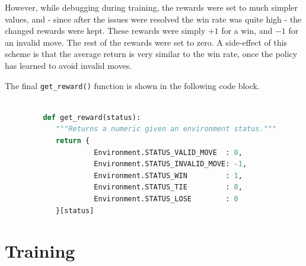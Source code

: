 \documentclass{article}
\begin{document}
   However, while debugging during training, the rewards were set to much simpler values, and - since
   after the issues were resolved the win rate was quite high - the changed rewards were kept. These rewards
   were simply $+1$ for a win, and $-1$ for an invalid move. The rest of the rewards were set to zero.
   A side-effect of this scheme is that the average return is very similar to the win rate, once the policy
   has learned to avoid invalid moves.

   The final \texttt{get\_reward()} function is shown in the following code block.
      \begin{lstlisting}[language=Python, label={reward}]

         def get_reward(status):
            """Returns a numeric given an environment status."""
            return {
                     Environment.STATUS_VALID_MOVE  : 0,
                     Environment.STATUS_INVALID_MOVE: -1,
                     Environment.STATUS_WIN         : 1,
                     Environment.STATUS_TIE         : 0,
                     Environment.STATUS_LOSE        : 0
            }[status]
      \end{lstlisting}


   \section{Training}
\end{document}
